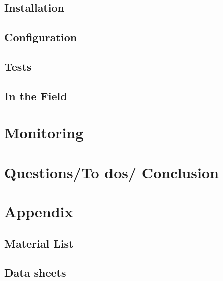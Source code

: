 \subsection{Installation}
\subsection{Configuration}
\subsection{Tests}
\subsection{In the Field}
\section{Monitoring}
\section{Questions/To dos/ Conclusion}
\section{Appendix}
\subsection{Material List}
\subsection{Data sheets}

%
